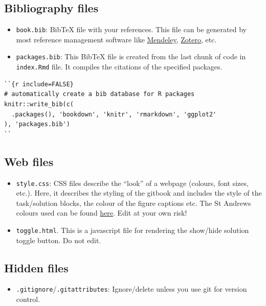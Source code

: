 \documentclass[
  british,
  oneside]{krantz}
\providecommand{\tightlist}{%
  \setlength{\itemsep}{0pt}\setlength{\parskip}{0pt}}
\theoremstyle{definition}
\theoremstyle{definition}
\theoremstyle{definition}
\theoremstyle{definition}
\theoremstyle{remark}
\begin{document}
\hypertarget{bibliography-files}{%
\subsection*{Bibliography files}\label{bibliography-files}}


\begin{itemize}
\item
  \texttt{book.bib}: BibTeX file with your references. This file can be generated by most reference management software like \href{https://www.mendeley.com/}{Mendeley}, \href{https://www.zotero.org/}{Zotero}, etc.
\item
  \texttt{packages.bib}: This BibTeX file is created from the last chunk of code in \texttt{index.Rmd} file. It compiles the citations of the specified packages.
\end{itemize}

\begin{verbatim}
``{r include=FALSE}
# automatically create a bib database for R packages
knitr::write_bib(c(
  .packages(), 'bookdown', 'knitr', 'rmarkdown', 'ggplot2'
), 'packages.bib')
``
\end{verbatim}

\hypertarget{web-files}{%
\subsection*{Web files}\label{web-files}}


\begin{itemize}
\item
  \texttt{style.css}: CSS files describe the ``look'' of a webpage (colours, font sizes, etc.). Here, it describes the styling of the gitbook and includes the style of the task/solution blocks, the colour of the figure captions etc. The St Andrews colours used can be found \href{https://www.st-andrews.ac.uk/brand/design-guidelines/colours/}{here}. Edit at your own risk!
\item
  \texttt{toggle.html}. This is a javascript file for rendering the show/hide solution toggle button. Do not edit.
\end{itemize}

\hypertarget{hidden-files}{%
\subsection*{Hidden files}\label{hidden-files}}


\begin{itemize}
\tightlist
\item
  \texttt{.gitignore}/\texttt{.gitattributes}: Ignore/delete unless you use git for version control.
\end{itemize}
\end{document}
